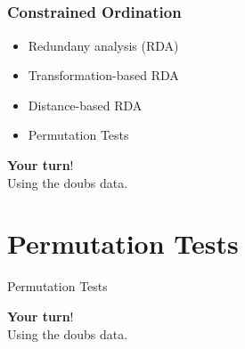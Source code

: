 \documentclass[9pt, compress]{beamer}\usepackage[]{graphicx}\usepackage[]{color}
\begin{document}
\subsection{}
\begin{frame}
\frametitle{Constrained Ordination}
\begin{itemize}
  \item Redundany analysis (RDA)
  \item Transformation-based RDA
  \item Distance-based RDA
  \item Permutation Tests
\end{itemize}
\end{frame}

\bgroup
{}
\begin{frame}[plain]{}
\begin{center}
  \color{background}
  \Huge \textbf{Your turn}! \\[1em]
  \large
  Using the doubs data. \\
\end{center}
\end{frame}
\egroup


\section{Permutation Tests}
\begin{frame}[plain]{}
\begin{center}
  \Huge \color{title} Permutation Tests
\end{center}
\end{frame}


\bgroup
{}
\begin{frame}[plain]{}
\begin{center}
  \color{background}
  \Huge \textbf{Your turn}! \\[1em]
  \large
  Using the doubs data. \\
\end{center}
\end{frame}
\egroup

\end{document}
